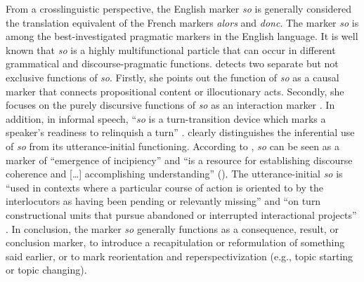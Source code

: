 \documentclass[output=paper]{langscibook}
\begin{document}
From a crosslinguistic perspective, the English marker \textit{so} is generally considered the translation equivalent of the French markers \textit{alors} and \textit{donc}. The marker \textit{so} is among the best-investigated pragmatic markers in the English language. It is well known that \textit{so} is a highly multifunctional particle that can occur in different grammatical and discourse-pragmatic functions. \citet{Schiffrin.1987} detects two separate but not exclusive functions of \textit{so}. Firstly, she points out the function of \textit{so} as a causal marker that connects propositional content or illocutionary acts. Secondly, she focuses on the purely discursive functions of \textit{so} as an interaction marker \citep[218]{Schiffrin.1987}. In addition, in informal speech, “\textit{so} is a turn-transition device which marks a speaker’s readiness to relinquish a turn” \citep[218]{Schiffrin.1987}. \citet{Bolden.2009} clearly distinguishes the inferential use of \textit{so} from its utterance-initial functioning. According to \citeauthor{Bolden.2009}, \textit{so} can be seen as a marker of “emergence of incipiency” and “is a resource for establishing discourse coherence and […] accomplishing understanding” (\citeyear[996]{Bolden.2009}). The utterance-initial \textit{so} is “used in contexts where a particular course of action is oriented to by the interlocutors as having been pending or relevantly missing” and “on turn constructional units that pursue abandoned or interrupted interactional projects” \citep[996]{Bolden.2009}. In conclusion, the marker \textit{so} generally functions as a consequence, result, or conclusion marker, to introduce a recapitulation or reformulation of something said earlier, or to mark reorientation and reperspectivization (e.g., topic starting or topic changing). 
\end{document}
